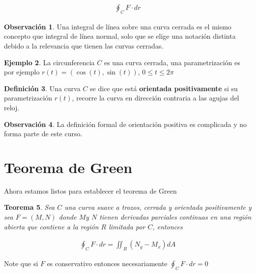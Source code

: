 \documentclass{article}
\theoremstyle{plain}
\newtheorem{thm}{Teorema}[section]
\theoremstyle{definition}
\newtheorem{defin}[thm]{Definición}
\newtheorem{ejem}[thm]{Ejemplo}
\newtheorem{rmk}[thm]{Observación}
\begin{document}
\begin{align*}
    \oint_C F \cdot dr
\end{align*}

\begin{rmk}Una integral de línea sobre una curva cerrada es el mismo concepto que integral de línea normal, solo que se elige una notación distinta debido a la relevancia que tienen las curvas cerradas. \\
\end{rmk}

\begin{ejem}La circunferencia $C$ es una curva cerrada, una parametrización es por ejemplo $r(t)=(\cos(t),\sin(t))$, $0 \leq t \leq 2\pi$ \\
\end{ejem}


\begin{defin}Una curva $C$ se dice que está \textbf{orientada positivamente} si su parametrización $r(t)$, recorre la curva en dirección contraria a las agujas del reloj. \\
\end{defin}

\begin{rmk}La definición formal de orientación positiva es complicada y no forma parte de este curso.
\end{rmk}





\newpage

\section{Teorema de Green}

Ahora estamos listos para establecer el teorema de Green \\

\begin{thm}Sea $C$ una curva suave a trozos, cerrada y orientada positivamente y sea $F=(M,N)$ donde $M$y $N$ tienen derivadas parciales continuas en una región abierta que contiene a la región $R$ limitada por $C$, entonces
\end{thm}


\begin{align*}
    \oint_C F \cdot dr = \iint_R \left( N_y-M_x\right) dA
\end{align*}

Note que si $F$ es conservativo entonces necesariamente $ \displaystyle \oint_C F \cdot dr = 0$ \\
\end{document}
